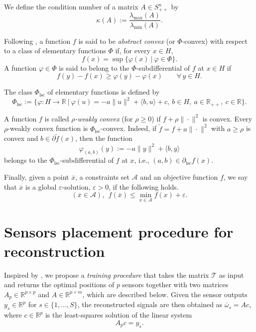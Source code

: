 \documentclass[12pt]{amsart}
\theoremstyle{plain}
\theoremstyle{definition}
\begin{document}
We define the condition number of a matrix $A\in S_{++}^n$ by
\[
\kappa(A) := \frac{\lambda_{\max}(A)}{\lambda_{\min}(A)}.
\]

Following \cite[equation 1.1.7 (sup)]{pallaschke2013foundations}, a function $f$ is said to be \emph{abstract convex} (or $\Phi$-convex) with respect to a class of elementary functions $\Phi$ if, for every $x\in H$,
\[
f(x) = \sup\bigl\{\varphi(x)\ \big|\ \varphi\in\Phi\bigr\}.
\]
A function $\varphi\in\Phi$ is said to belong to the $\Phi$-subdifferential of $f$ at $x\in H$ if
\begin{equation}
f(y)-f(x) \ge \varphi(y)-\varphi(x) \qquad \forall\, y\in H.
\end{equation}

The class $\Phi_{\mathrm{lsc}}$ of elementary functions is defined by
\begin{equation}
\label{def: class psi}
\Phi_{\mathrm{lsc}} := \bigl\{ \varphi:H\to\mathbb{R} \ \big|\ 
\varphi(u) = -a\|u\|^2 + \langle b,u\rangle + c,\ 
b\in H,\ a\in\mathbb{R}_{++},\ c\in\mathbb{R} \bigr\}.
\end{equation}

A function $f$ is called \emph{$\rho$-weakly convex} (for $\rho\ge 0$) if $f + \rho\|\cdot\|^2$ is convex. Every $\rho$-weakly convex function is $\Phi_{\mathrm{lsc}}$-convex. Indeed, if $\tilde{f}=f + a\|\cdot\|^2$ with $a\ge\rho$ is convex and $b\in\partial\tilde{f}(x)$, then the function
\[
\varphi_{(a,b)}(y) := -a\|y\|^2 + \langle b,y\rangle
\]
belongs to the $\Phi_{\mathrm{lsc}}$-subdifferential of $f$ at $x$, i.e., $(a,b)\in\partial_{\mathrm{lsc}}f(x)$.
		
		Finally, given a point $\overline{x}$, a constraints set $\mathcal{A}$ and an objective function $f$, we say that $\overline{x}$ is a global $\varepsilon$-solution, $\varepsilon>0$, if the following holds.
		\begin{equation}
		    \label{eps_glob}
		    (\overline{x}\in \mathcal{A}), \ \ f(\overline{x}) \le \min_{x\in \mathcal{A}} f(x)+\varepsilon.
		\end{equation}
		
	\section{Sensors placement procedure for reconstruction}
\label{sec: full procedure}

Inspired by \cite{manohar2017data}, we propose a \emph{training procedure} that takes the matrix $\mathcal{T}$ as input and returns the optimal positions of $p$ sensors together with two matrices $A_p \in \mathbb{R}^{p \times p}$ and $A \in \mathbb{R}^{p \times m}$, which are described below. Given the sensor outputs $y_s \in \mathbb{R}^p$ for $s \in \{1, \dots, S\}$, the reconstructed signals are then obtained as $\overline{\omega}_s = A c$, where $c \in \mathbb{R}^p$ is the least-squares solution of the linear system
\begin{equation}
\label{eq: least square}
A_p c = y_s.
\end{equation}
\end{document}
